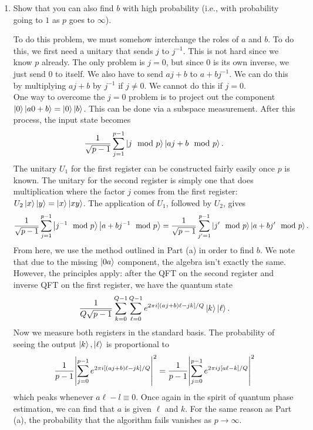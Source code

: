 \documentclass{article}
\theoremstyle{definition}
\newcommand{\f}[2]{\frac{#1}{#2}}
\begin{document}
\begin{enumerate}[label=(\alph*)]
\item Show that you can also find $b$ with high probability (i.e., with probability going to $1$ as $p$ goes to $\infty$). 

\noindent To do this problem, we must somehow interchange the roles of $a$ and $b$. To do this, we first need a unitary that sends $j$ to $j^{-1}$. This is not hard since we know $p$ already. The only problem is $j=0$, but since 0 is its own inverse, we just send $0$ to itself. We also have to send $aj+b$ to $a + bj^{-1}$. We can do this by multiplying $aj+b$ by $j^{-1}$ if $j\neq 0$. We cannot do this if $j=0$. \\

One way to overcome the $j=0$ problem is to project out the component $\ket{0} \ket{a 0 + b} = \ket{0}\ket{b}$. This can be done via a subspace measurement. After this process, the input state becomes
\begin{align*}
	\f{1}{\sqrt{p-1}}\sum_{j=1}^{p-1} \ket{j \mod p} \ket{aj + b \mod p}.
\end{align*}
The unitary $U_1$ for the first register can be constructed fairly easily once $p$ is known. The unitary for the second register is simply one that does multiplication where the factor $j$ comes from the first register: $U_2 \ket{x}\ket{y}= \ket{x}\ket{xy}$.  The application of $U_1$, followed by $U_2$, gives
\begin{align*}
		\f{1}{\sqrt{p-1}}\sum_{j=1}^{p-1} \ket{j^{-1} \mod p} \ket{a + b j^{-1} \mod p} = \f{1}{\sqrt{p-1}}\sum_{j'=1}^{p-1} \ket{j' \mod p} \ket{a + b j' \mod p}.
\end{align*}
From here, we use the method outlined in Part (a) in order to find $b$. We note that due to the missing $\ket{0a}$ component, the algebra isn't exactly the same. However, the principles apply: after the QFT on the second register and inverse QFT on the first register, we have the quantum state
\begin{align*}
	\f{1}{Q\sqrt{p-1}} \sum_{k=0}^{Q-1} \sum_{\ell = 0}^{Q-1} e^{2\pi i [(aj+b)\ell - jk]/Q} \ket{k} \ket{\ell}.
\end{align*}
Now we measure both registers in the standard basis. The probability of seeing the output $\ket{k}, \ket{\ell}$ is proportional to 
\begin{align*}
	\f{1}{p-1}\abs{\sum_{j=0}^{p-1} e^{2\pi i [ (aj+b)\ell - jk]  /Q }}^2 =  \f{1}{p-1}	\abs{\sum_{j=0}^{p-1} e^{2\pi i j [ a\ell - k]  /Q }}^2
\end{align*}
which peaks whenever $a\ell - l \equiv 0$. Once again in the spirit of quantum phase estimation, we can find that $a$ is given $\ell$ and $k$. For the same reason as Part (a), the probability that the algorithm fails vanishes as $p\to \infty$. 


\end{enumerate}
\end{document}
